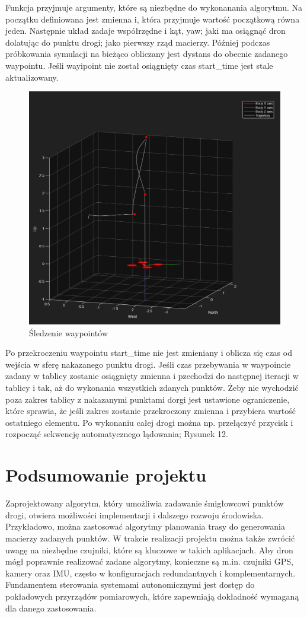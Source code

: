 \documentclass[polish,11pt,a4paper]{article}
\begin{document}
Funkcja przyjmuje argumenty, które są niezbędne do wykonanania algorytmu. Na początku definiowana jest
zmienna i, która przyjmuje wartość początkową równa jeden. Następnie układ zadaje współrzędne i kąt, yaw; jaki
ma osiągnąć dron dolatując do punktu drogi; jako pierwszy rząd macierzy. Później podczas próbkowania symulacji
na bieżąco obliczany jest dystans do obecnie zadanego waypointu. Jeśli wayipoint nie został osiągnięty
czas start\_time jest stale aktualizowany. 
\begin{figure}[ht]
    \centering
    \includegraphics[width=0.7\linewidth]{nakazane/nakaz.png}
    \caption{Śledzenie waypointów}
    \label{fig:enter-label}

\end{figure}
Po przekroczeniu waypointu start\_time nie jest zmieniany i oblicza się czas
od wejścia w sferę nakazanego punktu drogi. Jeśli czas przebywania w waypoincie zadany w tablicy zostanie osiągnięty
zmienna i pzechodzi do następnej iteracji w tablicy i tak, aż do wykonania wszystkich zdanych punktów. Żeby nie wychodzić poza 
zakres tablicy z nakazanymi punktami dorgi jest ustawione ograniczenie, które sprawia, że jeśli zakres zostanie przekroczony 
zmienna i przybiera wartość ostatniego elementu. Po wykonaniu całej drogi można np. przełączyć przycisk i rozpocząć
sekwencję automatycznego lądowania; Rysunek 12.
\section*{Podsumowanie projektu}
Zaprojektowany algorytm, który umożliwia zadawanie śmigłowcowi punktów drogi,
 otwiera możliwości implementacji i dalszego rozwoju środowiska. Przykładowo,
  można zastosować algorytmy planowania trasy do generowania macierzy zadanych
   punktów. W trakcie realizacji projektu można także zwrócić uwagę na niezbędne czujniki,
    które są kluczowe w takich aplikacjach. Aby dron mógł poprawnie realizować zadane 
    algorytmy, konieczne są m.in. czujniki GPS, kamery oraz IMU, często w konfiguracjach
     redundantnych i komplementarnych. Fundamentem sterowania systemami
      autonomicznymi jest dostęp do pokładowych przyrządów pomiarowych, które zapewniają 
      dokładność wymaganą dla danego zastosowania.
\end{document}
